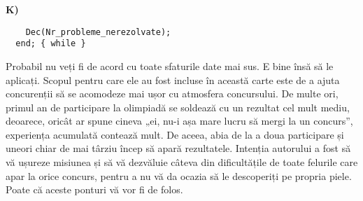 {\bf K)}

\begin{verbatim}
    Dec(Nr_probleme_nerezolvate);
  end; { while }
\end{verbatim}

\begin{center}
  {\Huge \decofourleft \decofourright}
\end{center}

Probabil nu veți fi de acord cu toate sfaturile date mai sus. E bine însă să
le aplicați. Scopul pentru care ele au fost incluse în această carte este de a
ajuta concurenții să se acomodeze mai ușor cu atmosfera concursului. De multe
ori, primul an de participare la olimpiadă se soldează cu un rezultat cel mult
mediu, deoarece, oricât ar spune cineva „ei, nu-i așa mare lucru să mergi la
un concurs”, experiența acumulată contează mult. De aceea, abia de la a doua
participare și uneori chiar de mai târziu încep să apară rezultatele. Intenția
autorului a fost să vă ușureze misiunea și să vă dezvăluie câteva din
dificultățile de toate felurile care apar la orice concurs, pentru a nu vă da
ocazia să le descoperiți pe propria piele. Poate că aceste ponturi vă vor fi
de folos.
